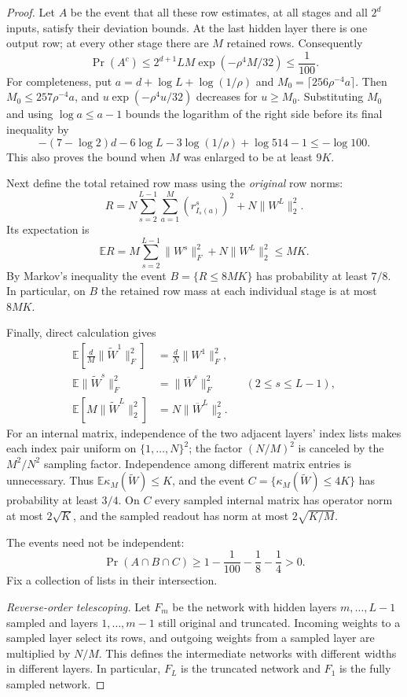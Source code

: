 \begin{proof}
Let $A$ be the event that all these row estimates, at all stages and
all $2^d$ inputs, satisfy their deviation bounds. At the last hidden
layer there is one output row; at every other stage there are $M$
retained rows. Consequently
\begin{equation}\label{eq:compression-hoeffding}
 \Pr(A^c)\leq 2^{d+1}LM\exp(-\rho^4M/32)\leq\frac1{100}.
\end{equation}
For completeness, put $a=d+\log L+\log(1/\rho)$ and
$M_0=\lceil256\rho^{-4}a\rceil$. Then
$M_0\leq257\rho^{-4}a$, and $u\exp(-\rho^4u/32)$ decreases for
$u\geq M_0$. Substituting $M_0$ and using $\log a\leq a-1$ bounds
the logarithm of the right side before its final inequality by
\[
 -(7-\log2)d-6\log L-3\log(1/\rho)+\log514-1
 \leq-\log100.
\]
This also proves the bound when $M$ was enlarged to be at least $9K$.

Next define the total retained row mass using the \emph{original}
row norms:
\[
 R=N\sum_{s=2}^{L-1}\sum_{a=1}^M(r^s_{I_s(a)})^2
      +N\|W^L\|_2^2.
\]
Its expectation is
\[
 \mathbb E R
 =M\sum_{s=2}^{L-1}\|W^s\|_F^2+N\|W^L\|_2^2
 \leq MK.
\]
By Markov's inequality the event $B=\{R\leq8MK\}$ has probability
at least $7/8$. In particular, on $B$ the retained row mass at each
individual stage is at most $8MK$.

Finally, direct calculation gives
\begin{align*}
 \mathbb E\left[\frac dM\|\widetilde W^1\|_F^2\right]
     &=\frac dN\|W^1\|_F^2,\\
 \mathbb E\|\widetilde W^s\|_F^2
     &=\|\overline W^s\|_F^2 &&(2\leq s\leq L-1),\\
 \mathbb E\left[M\|\widetilde W^L\|_2^2\right]
     &=N\|\overline W^L\|_2^2.
\end{align*}
For an internal matrix, independence of the two adjacent layers'
index lists makes each index pair uniform on $\{1,\ldots,N\}^2$;
the factor $(N/M)^2$ is canceled by the $M^2/N^2$ sampling factor.
Independence among different matrix entries is unnecessary.
Thus $\mathbb E\kappa_M(\widetilde W)\leq K$, and the event
$C=\{\kappa_M(\widetilde W)\leq4K\}$ has probability at least $3/4$.
On $C$ every sampled internal matrix has operator norm at most
$2\sqrt K$, and the sampled readout has norm at most $2\sqrt{K/M}$.

The events need not be independent:
\[
 \Pr(A\cap B\cap C)\geq1-\frac1{100}-\frac18-\frac14>0.
\]
Fix a collection of lists in their intersection.

\emph{Reverse-order telescoping.}
Let $F_m$ be the network with hidden layers $m,\ldots,L-1$ sampled
and layers $1,\ldots,m-1$ still original and truncated. Incoming
weights to a sampled layer select its rows, and outgoing weights from
a sampled layer are multiplied by $N/M$. This defines the intermediate
networks with different widths in different layers. In particular,
$F_L$ is the truncated network and $F_1$ is the fully sampled network.


\end{proof}
